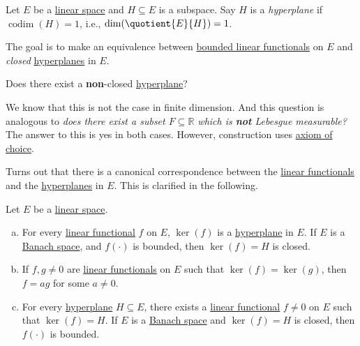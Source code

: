 \begin{definition}[Hyperplane]\label{def:hyperplane}
	Let \(E\) be a \hyperref[def:linear-vector-space]{linear space} and \(H\subseteq E\) is a subspace. Say \(H\) is a \emph{hyperplane} if \(\mathop{\mathrm{codim}}(H)=1\), i.e., \(\dim (\quotient{E}{H})=1\).
\end{definition}

The goal is to make an equivalence between \hyperref[def:bounded-linear-functional]{bounded linear functionals} on \(E\) and \emph{closed} \hyperref[def:hyperplane]{hyperplanes} in \(E\).

\begin{problem}
Does there exist a \textbf{non}-closed \hyperref[def:hyperplane]{hyperplane}?
\end{problem}
\begin{answer}
	We know that this is not the case in finite dimension. And this question is analogous to \emph{does there exist a subset \(F\subseteq \mathbb{R} \) which is \textbf{not} Lebesgue measurable?} The answer to this is yes in both cases. However, construction uses \href{https://en.wikipedia.org/wiki/Axiom_of_choice}{axiom of choice}.
\end{answer}

Turns out that there is a canonical correspondence between the \hyperref[def:linear-functional]{linear functionals} and the \hyperref[def:hyperplane]{hyperplanes} in \(E\). This is clarified in the following.

\begin{proposition}\label{prop:lec5-2}
	Let \(E\) be a \hyperref[def:linear-vector-space]{linear space}.
	\begin{enumerate}[(a)]
		\item For every \hyperref[def:linear-functional]{linear functional} \(f\) on \(E\), \(\ker(f)\) is a \hyperref[def:hyperplane]{hyperplane} in \(E\). If \(E\) is a \hyperref[def:Banach-space]{Banach space}, and \(f(\cdot)\) is bounded, then \(\ker(f) = H\) is closed.
		\item If \(f, g \neq 0\) are \hyperref[def:linear-functional]{linear functionals} on \(E\) such that \(\ker(f) = \ker(g)\), then \(f = ag\) for some \(a \neq 0\).
		\item For every \hyperref[def:hyperplane]{hyperplane} \(H\subseteq E\), there exists a \hyperref[def:linear-functional]{linear functional} \(f \neq 0\) on \(E\) such that \(\ker(f) = H\). If \(E\) is a \hyperref[def:Banach-space]{Banach space} and \(\ker(f) = H\) is closed, then \(f(\cdot)\) is bounded.
	\end{enumerate}
\end{proposition}